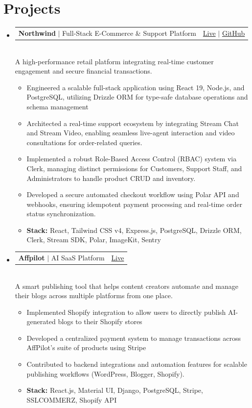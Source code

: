 \documentclass[letterpaper,10.5pt]{article}
\makeatletter
\newcommand{\resumeItem}[1]{
  \item\small{
    {#1 \vspace{-2pt}}
  }
}
\newcommand{\resumeProjectHeading}[2]{
    \item
    \begin{tabular*}{0.97\textwidth}{l@{\extracolsep{\fill}}r}
      \small#1 & #2 \\
    \end{tabular*}\vspace{-7pt}
}
\newcommand{\resumeSubHeadingListStart}{\begin{itemize}[leftmargin=0.15in, label={}]}
\newcommand{\resumeSubHeadingListEnd}{\end{itemize}}
\newcommand{\resumeItemListStart}{\begin{itemize}}
\newcommand{\resumeItemListEnd}{\end{itemize}\vspace{-5pt}}
\makeatother
\begin{document}
\section{Projects}
    \vspace{4pt}
    \resumeSubHeadingListStart
      \resumeProjectHeading
        {\textbf{Northwind} $|$ {Full-Stack E-Commerce \& Support Platform}}
        {\href{https://northwind-4967.onrender.com/}{{Live}} $|$
        \href{https://github.com/tahsin005/northwind}{{GitHub}}}
        \\\vspace{9pt}
        \small{A high-performance retail platform integrating real-time customer engagement and secure financial transactions.}
        \resumeItemListStart
          \resumeItem{Engineered a scalable full-stack application using {React 19}, {Node.js}, and {PostgreSQL}, utilizing {Drizzle ORM} for type-safe database operations and schema management}
          \resumeItem{Architected a real-time support ecosystem by integrating {Stream Chat} and {Stream Video}, enabling seamless live-agent interaction and video consultations for order-related queries.}
          \resumeItem{Implemented a robust {Role-Based Access Control (RBAC)} system via {Clerk}, managing distinct permissions for Customers, Support Staff, and Administrators to handle product CRUD and inventory.}
          \resumeItem{Developed a secure automated checkout workflow using {Polar API} and webhooks, ensuring idempotent payment processing and real-time order status synchronization.}
          \resumeItem{\textbf{Stack:} React, Tailwind CSS v4, Express.js, PostgreSQL, Drizzle ORM, Clerk, Stream SDK, Polar, ImageKit, Sentry}
        \resumeItemListEnd
      \vspace{8pt}
      \resumeProjectHeading
          {\textbf{Affpilot} $|$ {AI SaaS Platform}}
            {\href{https://app.affpilot.com}{{Live}}}
          \\\vspace{9pt}
          \small{A smart publishing tool that helps content creators automate and manage their blogs across multiple platforms from one place.}
          \resumeItemListStart
            \resumeItem{Implemented Shopify integration to allow users to directly publish AI-generated blogs to their Shopify stores}
            \resumeItem{Developed a centralized payment system to manage transactions across AffPilot’s suite of products using Stripe}
            \resumeItem{Contributed to backend integrations and automation features for scalable publishing workflows (WordPress, Blogger, Shopify).  }
            \resumeItem{\textbf{Stack:} React.js, Material UI, Django, PostgreSQL, Stripe, SSLCOMMERZ, Shopify API}
          \resumeItemListEnd
    \resumeSubHeadingListEnd
\end{document}
